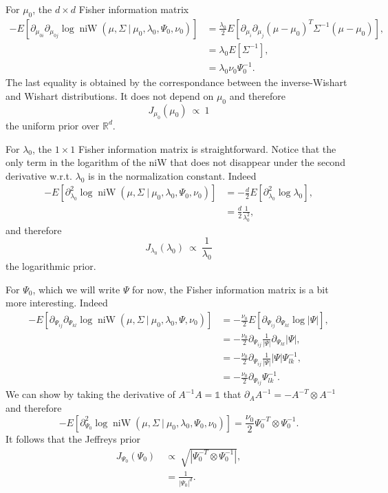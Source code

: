 \documentclass[11pt, oneside]{article}   	%
\DeclareMathOperator{\niW}{niW}
\begin{document}
For $\mu_0$, the $d\times d$ Fisher information matrix
\begin{equation}\begin{split}
-E\left[\partial_{\mu_{0i}}\partial_{\mu_{0j}} \log \niW(\mu,\Sigma~\vert~\mu_0,\lambda_0,\Psi_0,\nu_0)\right] &= \frac{\lambda_0}{2}E[\partial_{\mu_i}\partial_{\mu_j}(\mu - \mu_0)^T\Sigma^{-1}(\mu - \mu_0)],\\
&= \lambda_0 E[\Sigma^{-1}],\\
&= \lambda_0\nu_0\Psi_0^{-1}.
\end{split}\end{equation}
The last equality is obtained by the correspondance between the inverse-Wishart and Wishart distributions. It does not depend on $\mu_0$ and therefore
$$J_{\mu_0}(\mu_0)~\propto~1$$
the uniform prior over $\mathbb{R}^d$.

For $\lambda_0$, the $1\times 1$ Fisher information matrix is straightforward. Notice that the only term in the logarithm of the niW that does not disappear under the second derivative w.r.t. $\lambda_0$ is in the normalization constant. Indeed
\begin{equation}\begin{split}
-E\left[\partial^2_{\lambda_0}\log \niW(\mu,\Sigma~\vert~\mu_0,\lambda_0,\Psi_0,\nu_0)\right] &= -\frac{d}{2}E[\partial^2_{\lambda_0}\log \lambda_0],\\
&= \frac{d}{2}\frac{1}{\lambda_0^2},
\end{split}\end{equation}
and therefore
$$J_{\lambda_0}(\lambda_0)~\propto~\frac{1}{\lambda_0}$$
the logarithmic prior.

For $\Psi_0$, which we will write $\Psi$ for now, the Fisher information matrix is a bit more interesting. Indeed
\begin{equation}\begin{split}
-E\left[\partial_{\Psi_{ij}}\partial_{\Psi_{kl}}\log \niW(\mu,\Sigma~\vert~\mu_0,\lambda_0,\Psi,\nu_0)\right] &= -\frac{\nu_0}{2}E[\partial_{\Psi_{ij}}\partial_{\Psi_{kl}}\log\vert\Psi\vert], \\
&=-\frac{\nu_0}{2}\partial_{\Psi_{ij}}\frac{1}{\vert\Psi\vert}\partial_{\Psi_{kl}}\vert\Psi\vert,\\
&= -\frac{\nu_0}{2}\partial_{\Psi_{ij}}\frac{1}{\vert\Psi\vert}\vert\Psi\vert \Psi^{-1}_{lk},\\
&=-\frac{\nu_0}{2} \partial_{\Psi_{ij}}\Psi_{lk}^{-1}.
\end{split}\end{equation}
We can show by taking the derivative of $A^{-1} A = \mathbb{1}$ that $\partial_A A^{-1} = -A^{-
T}\otimes A^{-1}$ and therefore
$$-E\left[\partial^2_{\Psi_{0}}\log \niW(\mu,\Sigma~\vert~\mu_0,\lambda_0,\Psi_0,\nu_0)\right] = \frac{\nu_0}{2}\Psi_0^{-T}\otimes\Psi_0^{-1}.$$
It follows that the Jeffreys prior
\begin{equation}\begin{split}
J_{\Psi_0}(\Psi_0)~&\propto~ \sqrt{\left\vert\Psi_0^{-T}\otimes\Psi_0^{-1}\right\vert},\\
&= \frac{1}{\left\vert\Psi_0\right\vert^d}.
\end{split}\label{eq:jeffpsi}\end{equation}
\end{document}
